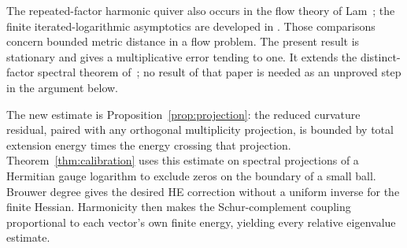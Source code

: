 The repeated-factor harmonic quiver also occurs in the flow theory of
Lam~\cite[Theorems~8.2, 8.7 and Proposition~8.9]{lam2026}; the finite
iterated-logarithmic asymptotics are developed in
\cite[Theorem~5.11]{hkkp2023}. Those comparisons concern bounded metric
distance in a flow problem. The present result is stationary and gives
a multiplicative error tending to one. It extends the distinct-factor
spectral theorem of~\cite{wuebben2026uniform}; no result of that paper
is needed as an unproved step in the argument below.

The new estimate is Proposition~\ref{prop:projection}: the reduced
curvature residual, paired with any orthogonal multiplicity projection,
is bounded by total extension energy times the energy crossing that
projection. Theorem~\ref{thm:calibration} uses this estimate on spectral
projections of a Hermitian gauge logarithm to exclude zeros on the
boundary of a small ball. Brouwer degree gives the desired HE correction
without a uniform inverse for the finite Hessian. Harmonicity then makes
the Schur-complement coupling proportional to each vector's own finite
energy, yielding every relative eigenvalue estimate.
